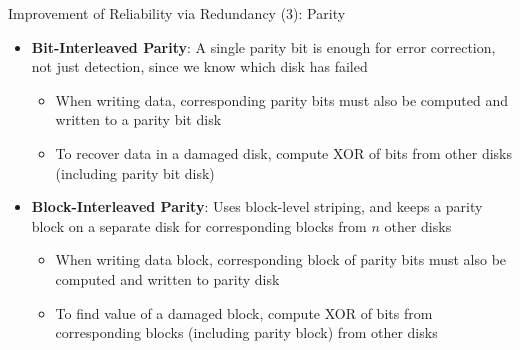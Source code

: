 \documentclass[aspectratio=169, xcolor=dvipsnames]{beamer}
\begin{document}
\begin{frame}{Improvement of Reliability via Redundancy (3): Parity}
    \begin{itemize}[<+->]
        \item \textbf{Bit-Interleaved Parity}: A single parity bit is enough for error correction, not just detection, since we know which disk has failed
        \begin{itemize}
            \item[$\triangleright$] When writing data, corresponding parity bits must also be computed and written to a parity bit disk
            \item[$\triangleright$] To recover data in a damaged disk, compute XOR of bits from other disks (including parity bit disk)
        \end{itemize}
        \item \textbf{Block-Interleaved Parity}: Uses block-level striping, and keeps a parity block on a separate disk for corresponding blocks from $n$ other disks
        \begin{itemize}
            \item[$\triangleright$] When writing data block, corresponding block of parity bits must also be computed and written to parity disk
            \item[$\triangleright$] To find value of a damaged block, compute XOR of bits from corresponding blocks (including parity block) from other disks
        \end{itemize}
    \end{itemize}
\end{frame}
\end{document}
